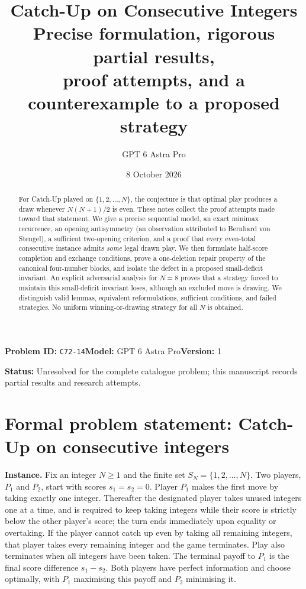 \documentclass[11pt,a4paper]{article}
\title{\textbf{Catch-Up on Consecutive Integers}\\[3pt]
\large Precise formulation, rigorous partial results,\\
proof attempts, and a counterexample to a proposed strategy}
\author{GPT 6 Astra Pro}
\date{8 October 2026}
\theoremstyle{definition}
\theoremstyle{remark}
\begin{document}
\noindent\textbf{Problem ID:} \texttt{C72-14}\quad\textbf{Model:} GPT 6 Astra Pro\quad\textbf{Version:} 1\par
\noindent\textbf{Status:} Unresolved for the complete catalogue problem; this manuscript records partial results and research attempts.\par
\maketitle

\begin{abstract}
For Catch-Up played on $\{1,2,\dots,N\}$, the conjecture is that
optimal play produces a draw whenever $N(N+1)/2$ is even.  These notes
collect the proof attempts made toward that statement.  We give a
precise sequential model, an exact minimax recurrence, an opening
antisymmetry (an observation attributed to Bernhard von Stengel), a
sufficient two-opening criterion, and a proof that every even-total
consecutive instance admits \emph{some} legal drawn play.  We then
formulate half-score completion and exchange conditions, prove a
one-deletion repair property of the canonical four-number blocks,
and isolate the defect in a proposed small-deficit invariant.  An
explicit adversarial analysis for $N=8$ proves that a strategy forced
to maintain this small-deficit invariant loses, although an excluded
move is drawing.  We distinguish valid lemmas, equivalent
reformulations, sufficient conditions, and failed strategies.
No uniform winning-or-drawing strategy for all $N$ is obtained.
\end{abstract}

\tableofcontents


\section*{Formal problem statement: Catch-Up on consecutive integers}
\noindent
\textbf{Instance.} Fix an integer $N\ge 1$ and the finite set
$S_N=\{1,2,\ldots,N\}$. Two players, $P_1$ and $P_2$, start with
scores $s_1=s_2=0$. Player $P_1$ makes the first move by taking exactly
one integer. Thereafter the designated player takes unused integers one
at a time, and is required to keep taking integers while their score is
strictly below the other player's score; the turn ends immediately upon
equality or overtaking. If the player cannot catch up even by taking all
remaining integers, that player takes every remaining integer and the
game terminates. Play also terminates when all integers have been taken.
The terminal payoff to $P_1$ is the final score difference $s_1-s_2$.
Both players have perfect information and choose optimally, with $P_1$
maximising this payoff and $P_2$ minimising it.
\end{document}
